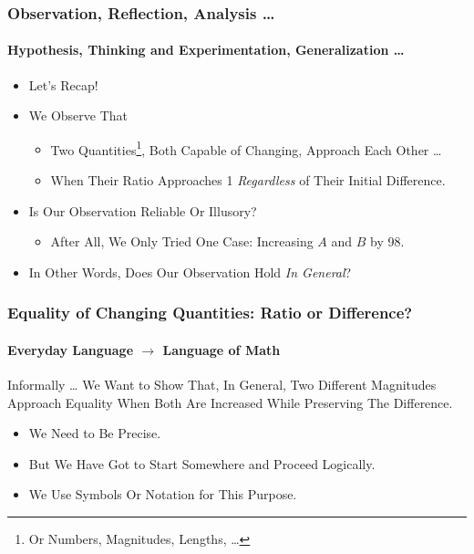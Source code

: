 \documentclass{beamer}
\begin{document}
\begin{frame}
\frametitle{Observation, Reflection, Analysis \dots}
\framesubtitle{Hypothesis, Thinking and Experimentation, Generalization \dots}
\label{slide:generalization}
\begin{itemize}
\item Let's Recap!
\pause
\item We Observe That 
\begin{itemize}
\pause
\item Two Quantities\footnote{Or Numbers, Magnitudes, Lengths, \dots}, Both Capable of Changing, \alert{Approach Each Other} \dots
\pause
\item When Their \alert{Ratio Approaches 1 \textit{Regardless} of Their Initial Difference}.
\end{itemize}
\pause
\item Is Our Observation Reliable Or Illusory?
\pause
\begin{itemize}
\item After All, We \alert{Only Tried One Case}: Increasing $A$ and $B$ by 98.
\end{itemize}
\item In Other Words, Does \alert{Our Observation Hold \textit{In General}?}
\end{itemize}
\end{frame}

\begin{frame}
\frametitle{Equality of Changing Quantities: Ratio or Difference?}
\framesubtitle{Everyday Language $\rightarrow$ Language of Math}
\label{slide:expressmath}
\begin{block}{Informally \dots}
We Want to Show That, In General, Two Different Magnitudes Approach Equality When Both Are Increased While Preserving The Difference.
\end{block}
\begin{itemize}
\pause
\item We Need to Be Precise.
\pause
\item But We Have Got to Start Somewhere and Proceed Logically.
\pause
\item We Use Symbols Or Notation for This Purpose.
\end{itemize}
\end{frame}
\end{document}
